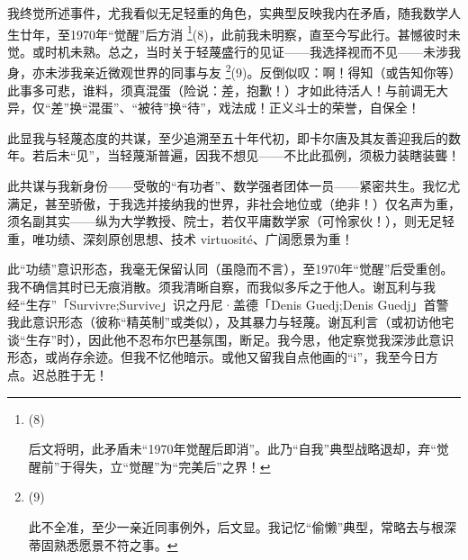 我终觉所述事件，尤我看似无足轻重的角色，实典型反映我内在矛盾，随我数学人生廿年，至1970年“觉醒”后方消 \footnote{(8)\par 后文将明，此矛盾未“1970年觉醒后即消”。此乃“自我”典型战略退却，弃“觉醒前”于得失，立“觉醒”为“完美后”之界！}(8)，此前我未明察，直至今写此行。甚憾彼时未觉。或时机未熟。总之，当时关于轻蔑盛行的见证——我选择视而不见——未涉我身，亦未涉我亲近微观世界的同事与友 \footnote{(9)\par 此不全准，至少一亲近同事例外，后文显。我记忆“偷懒”典型，常略去与根深蒂固熟悉愿景不符之事。}(9)。反倒似叹：啊！得知（或告知你等）此事多可悲，谁料，须真混蛋（险说：差，抱歉！）才如此待活人！与前调无大异，仅“差”换“混蛋”、“被待”换“待”，戏法成！正义斗士的荣誉，自保全！

此显我与轻蔑态度的共谋，至少追溯至五十年代初，即卡尔唐及其友善迎我后的数年。若后未“见”，当轻蔑渐普遍，因我不想见——不比此孤例，须极力装瞎装聾！

此共谋与我新身份——受敬的“有功者”、数学强者团体一员——紧密共生。我忆尤满足，甚至骄傲，于我选并接纳我的世界，非社会地位或（绝非！）仅名声为重，须名副其实——纵为大学教授、院士，若仅平庸数学家（可怜家伙！），则无足轻重，唯功绩、深刻原创思想、技术 virtuosité、广阔愿景为重！

此“功绩”意识形态，我毫无保留认同（虽隐而不言），至1970年“觉醒”后受重创。我不确信其时已无痕消散。须我清晰自察，而我似多斥之于他人。谢瓦利与我经“生存”「Survivre;Survive」识之丹尼·盖德「Denis Guedj;Denis Guedj」首警我此意识形态（彼称“精英制”或类似），及其暴力与轻蔑。谢瓦利言（或初访他宅谈“生存”时），因此他不忍布尔巴基氛围，断足。我今思，他定察觉我深涉此意识形态，或尚存余迹。但我不忆他暗示。或他又留我自点他画的“i”，我至今日方点。迟总胜于无！